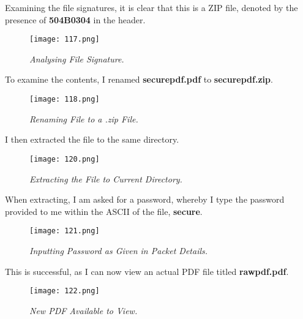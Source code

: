 Examining the file signatures, it is clear that this is a ZIP file, denoted by the presence of \textbf{504B0304} in the header.
\begin{figure}[H]
    \setlength{\abovecaptionskip}{20pt}
    \setlength{\belowcaptionskip}{0pt}
    \centering
    \texttt{[image: 117.png]}
    \captionsetup{justification=centering}
    \caption{\textit{Analysing File Signature.}}
    \label{fig:117}
\end{figure}
\vspace{-10pt}

To examine the contents, I renamed \textbf{securepdf.pdf} to \textbf{securepdf.zip}.

\begin{figure}[H]
    \setlength{\abovecaptionskip}{20pt}
    \setlength{\belowcaptionskip}{0pt}
    \centering
    \texttt{[image: 118.png]}
    \captionsetup{justification=centering}
    \caption{\textit{Renaming File to a .zip File.}}
    \label{fig:118}
\end{figure}
\vspace{-10pt}

I then extracted the file to the same directory.

\begin{figure}[H]
    \setlength{\abovecaptionskip}{20pt}
    \setlength{\belowcaptionskip}{0pt}
    \centering
    \texttt{[image: 120.png]}
    \captionsetup{justification=centering}
    \caption{\textit{Extracting the File to Current Directory.}}
    \label{fig:120}
\end{figure}
\vspace{-10pt}

When extracting, I am asked for a password, whereby I type the password provided to me within the ASCII of the file, \textbf{secure}.
\begin{figure}[H]
    \setlength{\abovecaptionskip}{20pt}
    \setlength{\belowcaptionskip}{0pt}
    \centering
    \texttt{[image: 121.png]}
    \captionsetup{justification=centering}
    \caption{\textit{Inputting Password as Given in Packet Details.}}
    \label{fig:121}
\end{figure}
\vspace{-10pt}

This is successful, as I can now view an actual PDF file titled \textbf{rawpdf.pdf}. 


\begin{figure}[H]
    \setlength{\abovecaptionskip}{20pt}
    \setlength{\belowcaptionskip}{0pt}
    \centering
    \texttt{[image: 122.png]}
    \captionsetup{justification=centering}
    \caption{\textit{New PDF Available to View.}}
    \label{fig:122}
\end{figure}
\vspace{-10pt}

